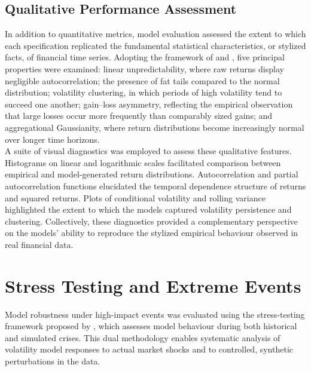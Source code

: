 \documentclass[oneside,12pt]{CUEDthesisPSnPDF}
\newcommand{\textcite}{\citet}
\begin{document}

\subsection{Qualitative Performance Assessment}

\noindent
In addition to quantitative metrics, model evaluation assessed the extent to which each specification replicated the fundamental statistical characteristics, or stylized facts, of financial time series. Adopting the framework of \textcite{kobyzev2020normalising} and \textcite{eckerli2021generative}, five principal properties were examined: linear unpredictability, where raw returns display negligible autocorrelation; the presence of fat tails compared to the normal distribution; volatility clustering, in which periods of high volatility tend to succeed one another; gain–loss asymmetry, reflecting the empirical observation that large losses occur more frequently than comparably sized gains; and aggregational Gaussianity, where return distributions become increasingly normal over longer time horizons.\\

\medskip
\noindent
A suite of visual diagnostics was employed to assess these qualitative features. Histograms on linear and logarithmic scales facilitated comparison between empirical and model-generated return distributions. Autocorrelation and partial autocorrelation functions elucidated the temporal dependence structure of returns and squared returns. Plots of conditional volatility and rolling variance highlighted the extent to which the models captured volatility persistence and clustering. Collectively, these diagnostics provided a complementary perspective on the models’ ability to reproduce the stylized empirical behaviour observed in real financial data.\\


\section{Stress Testing and Extreme Events}
\noindent
Model robustness under high-impact events was evaluated using the stress-testing framework proposed by \textcite{fu2019time}, which assesses model behaviour during both historical and simulated crises. This dual methodology enables systematic analysis of volatility model responses to actual market shocks and to controlled, synthetic perturbations in the data.\\
\end{document}
